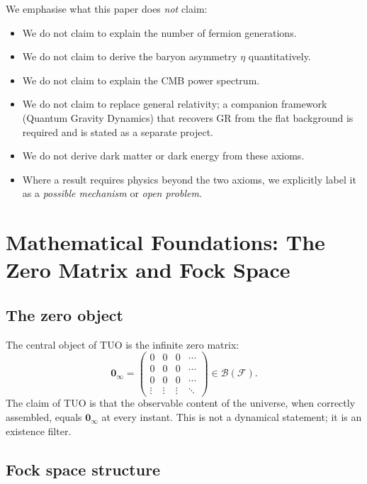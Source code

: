 \documentclass[12pt,a4paper]{article}
\theoremstyle{definition}
\theoremstyle{remark}
\newcommand{\ZeroMat}{\mathbf{0}_{\infty}}
\newcommand{\Fock}{\mathcal{F}}
\begin{document}
We emphasise what this paper does \emph{not} claim:
\begin{itemize}[leftmargin=2em]
  \item We do not claim to explain the number of fermion generations.
  \item We do not claim to derive the baryon asymmetry $\eta$
        quantitatively.
  \item We do not claim to explain the CMB power spectrum.
  \item We do not claim to replace general relativity; a companion
        framework (Quantum Gravity Dynamics) that recovers GR from the
        flat background is required and is stated as a separate project.
  \item We do not derive dark matter or dark energy from these axioms.
  \item Where a result requires physics beyond the two axioms, we
        explicitly label it as a \emph{possible mechanism} or
        \emph{open problem}.
\end{itemize}

\section{Mathematical Foundations: The Zero Matrix and Fock Space}
\label{sec:math}

\subsection{The zero object}

The central object of TUO is the infinite zero matrix:
\begin{equation}\label{eq:zero_matrix}
  \ZeroMat = \begin{pmatrix}
    0 & 0 & 0 & \cdots \\
    0 & 0 & 0 & \cdots \\
    0 & 0 & 0 & \cdots \\
    \vdots & \vdots & \vdots & \ddots
  \end{pmatrix}
  \in \mathcal{B}(\Fock).
\end{equation}
The claim of TUO is that the observable content of the universe, when
correctly assembled, equals $\ZeroMat$ at every instant.
This is not a dynamical statement; it is an existence filter.

\subsection{Fock space structure}
\end{document}
